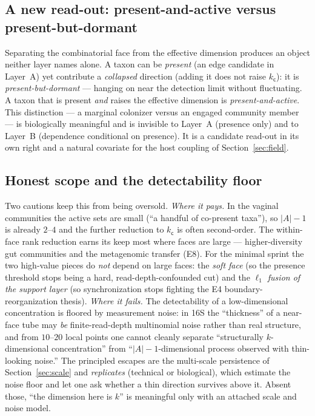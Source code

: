 \documentclass[11pt]{article}
\theoremstyle{definition}
\theoremstyle{plain}
\theoremstyle{remark}
\newcommand{\1}{\mathbf{1}}
\newcommand{\cc}{\mathsf{c}}              %
\newcommand{\abs}[1]{\lvert #1 \rvert}
\begin{document}
\subsection{A new read-out: present-and-active versus present-but-dormant}
\label{sec:dormant}

Separating the combinatorial face from the effective dimension produces an object
neither layer names alone. A taxon can be \emph{present} (an edge candidate in
Layer~A) yet contribute a \emph{collapsed} direction (adding it does not raise
$k_\cc$): it is \emph{present-but-dormant} --- hanging on near the detection limit
without fluctuating. A taxon that is present \emph{and} raises the effective
dimension is \emph{present-and-active}. This distinction --- a marginal colonizer
versus an engaged community member --- is biologically meaningful and is invisible
to Layer~A (presence only) and to Layer~B (dependence conditional on presence). It
is a candidate read-out in its own right and a natural covariate for the host
coupling of Section~\ref{sec:field}.

\subsection{Honest scope and the detectability floor}
\label{sec:scope}

Two cautions keep this from being oversold.
\emph{Where it pays.} In the vaginal communities the active sets are small (``a
handful of co-present taxa''), so $\abs{A}-1$ is already $2$--$4$ and the further
reduction to $k_\cc$ is often second-order. The within-face rank reduction earns
its keep most where faces are large --- higher-diversity gut communities and the
metagenomic transfer (E8). For the minimal sprint the two high-value pieces do
\emph{not} depend on large faces: the \emph{soft face} (so the presence threshold
stops being a hard, read-depth-confounded cut) and the \emph{$\ell_1$ fusion of
the support layer} (so synchronization stops fighting the E4 boundary-
reorganization thesis).
\emph{Where it fails.} The detectability of a low-dimensional concentration is
floored by measurement noise: in 16S the ``thickness'' of a near-face tube may
\emph{be} finite-read-depth multinomial noise rather than real structure, and from
$10$--$20$ local points one cannot cleanly separate ``structurally $k$-dimensional
concentration'' from ``$\abs{A}-1$-dimensional process observed with thin-looking
noise.'' The principled escapes are the multi-scale persistence of
Section~\ref{sec:scale} and \emph{replicates} (technical or biological), which
estimate the noise floor and let one ask whether a thin direction survives above
it. Absent those, ``the dimension here is $k$'' is meaningful only with an
attached scale and noise model.
\end{document}
